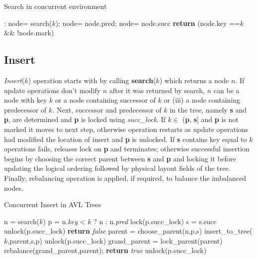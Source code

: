 \documentclass[MTech]{iitmdiss}
\begin{document}
\begin{algorithm}
\caption{Search in concurrent environment}
\begin{algorithmic}[1]
:
\State node= search($k$);
    \State node= node.pred;
    \EndWhile
{}
    \State node= node.succ
    \EndWhile 
\State \textbf{return} (node.key ==$k$ $\&\&$ !node.mark)
\EndFunction
\end{algorithmic}
\end{algorithm}

\subsection{Insert} 
\textit{Insert}($k$) operation starts with by calling \textbf{search}($k$) which returns a node $n$. If update operations don't modify $n$ after it was returned by search, $n$ can be a node with key $k$ or a node containing successor of $k$ or (iii) a node containing predecessor of $k$. Next, successor and predecessor of $k$ in the tree, namely \textbf{s} and \textbf{p}, are determined and \textbf{p} is locked using \textit{succ\_lock}. If $k \in$ (\textbf{p}, \textbf{s}] and \textbf{p} is not marked it moves to next step, otherwise operation restarts as update operations had modified the location of insert and \textbf{p} is unlocked. If \textbf{s} contains key equal to $k$ operations fails, releases lock on \textbf{p} and terminates; otherwise successful insertion begins by choosing the correct parent between \textbf{s} and \textbf{p} and locking it before updating the logical ordering followed by physical layout fields of the tree. Finally, rebalancing operation is applied, if required, to balance the imbalanced nodes. 

\begin{algorithm}
\caption{Concurrent Insert in AVL Trees}
\begin{algorithmic}[1]
 \State   n = search($k$)
 \State   p = n.\textit{key} < $k$ ? n : n.\textit{pred}
 \State   lock(p.succ\_lock)
 \State   s = s.succ
 \If{k $\in$ (p.$key$, s.$key$] \&\& !p.$mark$}
            \State unlock(p.succ\_lock)
            \State \textbf{return} \textit{false}
        \EndIf
    \State parent = choose\_parent(n,p,s)
    \State insert\_to\_tree($k$,parent,s,p)
    \State unlock(p.succ\_lock)
    \State grand\_parent = lock\_parent(parent)
    \State rebalance(grand\_parent,parent);
    \State \textbf{return} \textit{true}
 \EndIf
   \State unlock(p.succ\_lock)
\EndWhile
\EndFunction
\end{algorithmic}
\end{algorithm}
\end{document}
